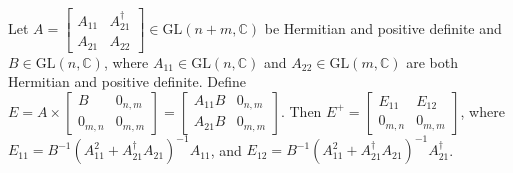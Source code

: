 \documentclass[10pt,a4paper]{amsart}
\begin{document}
  \begin{lemma} \label{lemma:pseudoinverse_product}
    Let $A = \begin{bmatrix} A_{11} & A_{21}^{\dagger} \\ A_{21} & A_{22} \end{bmatrix} \in \mathrm{GL}(n+m, \mathbb{C})$ be Hermitian and positive definite and $B \in \mathrm{GL}(n, \mathbb{C})$, where $A_{11} \in \mathrm{GL}(n, \mathbb{C})$ and $A_{22} \in \mathrm{GL}(m, \mathbb{C})$ are both Hermitian and positive definite. Define $E = A \times \begin{bmatrix} B & 0_{n,m} \\ 0_{m,n} & 0_{m,m} \end{bmatrix} = \begin{bmatrix} A_{11} B & 0_{n,m} \\ A_{21} B & 0_{m,m} \end{bmatrix}$. Then $E^{+} = \begin{bmatrix} E_{11} & E_{12} \\ 0_{m,n} & 0_{m,m} \end{bmatrix}$, where $E_{11} = B^{-1} \left(A_{11}^2 + A_{21}^{\dagger}A_{21}\right)^{-1} A_{11}$, and $E_{12} = B^{-1} \left(A_{11}^2 + A_{21}^{\dagger}A_{21}\right)^{-1} A_{21}^{\dagger}$.
  \end{lemma}
\end{document}
